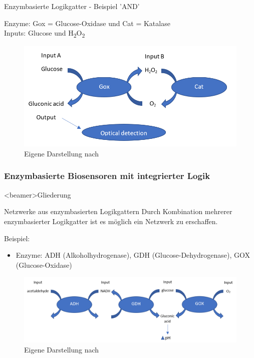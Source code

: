 \documentclass{beamer}
\begin{document}
    \begin{frame}{Enzymbasierte Logikgatter - Beispiel 'AND'}
    
    Enzyme: Gox = Glucose-Oxidase und Cat = Katalase\\
    Inputs: Glucose und H\textsubscript{2}O\textsubscript{2}
    
     \begin{figure}[H] \centering \includegraphics[scale= 0.33]{pics/ANDneu.png} \caption{Eigene Darstellung nach \cite{hallo4} } \label{img:and} 	
   	 \end{figure}
  
    \end{frame}


    \subsubsection{Enzymbasierte Biosensoren mit integrierter Logik}
    
    \begin{frame}<beamer>{Gliederung}
	\end{frame}
    
    \begin{frame}{Netzwerke aus enzymbasierten Logikgattern}
    	Durch Kombination mehrerer enzymbasierter Logikgatter ist es m{\"o}glich ein Netzwerk zu erschaffen.
    	
    	Beispiel: 
    	\begin{itemize}
    		\item Enzyme: ADH (Alkoholhydrogenase), GDH (Glucose-Dehydrogenase), GOX (Glucose-Oxidase)
    	\end{itemize}
    	\begin{figure}
    		\centering \scriptsize \includegraphics[scale= 0.30]{pics/network1.png}
    	\caption{Eigene Darstellung nach \cite{hallo4}} 
   		\end{figure}
   		
   	
    
	\end{frame}
\end{document}
